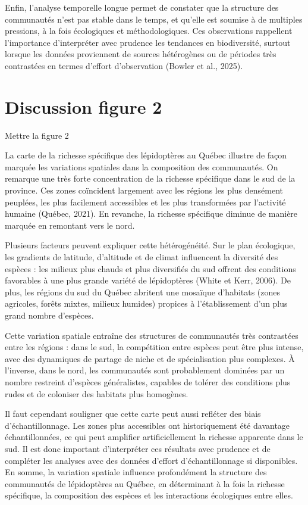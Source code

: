 \documentclass[9pt,twocolumn,twoside,]{pnas-new}
\begin{document}
Enfin, l'analyse temporelle longue permet de constater que la structure
des communautés n'est pas stable dans le temps, et qu'elle est soumise à
de multiples pressions, à la fois écologiques et méthodologiques. Ces
observations rappellent l'importance d'interpréter avec prudence les
tendances en biodiversité, surtout lorsque les données proviennent de
sources hétérogènes ou de périodes très contrastées en termes d'effort
d'observation (Bowler et al., 2025).

\section*{Discussion figure 2}\label{discussion-figure-2}

Mettre la figure 2

La carte de la richesse spécifique des lépidoptères au Québec illustre
de façon marquée les variations spatiales dans la composition des
communautés. On remarque une très forte concentration de la richesse
spécifique dans le sud de la province. Ces zones coïncident largement
avec les régions les plus densément peuplées, les plus facilement
accessibles et les plus transformées par l'activité humaine (Québec,
2021). En revanche, la richesse spécifique diminue de manière marquée en
remontant vers le nord.

Plusieurs facteurs peuvent expliquer cette hétérogénéité. Sur le plan
écologique, les gradients de latitude, d'altitude et de climat
influencent la diversité des espèces : les milieux plus chauds et plus
diversifiés du sud offrent des conditions favorables à une plus grande
variété de lépidoptères (White et Kerr, 2006). De plus, les régions du
sud du Québec abritent une mosaïque d'habitats (zones agricoles, forêts
mixtes, milieux humides) propices à l'établissement d'un plus grand
nombre d'espèces.

Cette variation spatiale entraîne des structures de communautés très
contrastées entre les régions : dans le sud, la compétition entre
espèces peut être plus intense, avec des dynamiques de partage de niche
et de spécialisation plus complexes. À l'inverse, dans le nord, les
communautés sont probablement dominées par un nombre restreint d'espèces
généralistes, capables de tolérer des conditions plus rudes et de
coloniser des habitats plus homogènes.

Il faut cependant souligner que cette carte peut aussi refléter des
biais d'échantillonnage. Les zones plus accessibles ont historiquement
été davantage échantillonnées, ce qui peut amplifier artificiellement la
richesse apparente dans le sud. Il est donc important d'interpréter ces
résultats avec prudence et de compléter les analyses avec des données
d'effort d'échantillonnage si disponibles. En somme, la variation
spatiale influence profondément la structure des communautés de
lépidoptères au Québec, en déterminant à la fois la richesse spécifique,
la composition des espèces et les interactions écologiques entre elles.
\end{document}
